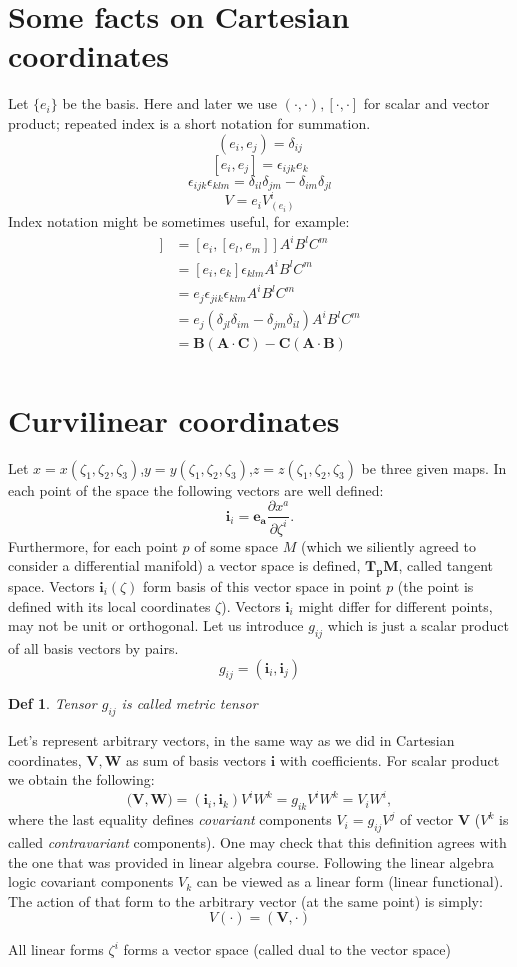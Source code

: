 \documentclass{article}
\newtheorem{defn}{Def}
\begin{document}
 \section{Some facts on Cartesian coordinates} Let $\{e_i\}$ be the basis. Here and later we use $(\cdot, \cdot), [\cdot, \cdot]$ for scalar and vector product; repeated index is a short notation for summation.
 $$(e_i, e_j)=\delta_{ij}$$
 $$[e_i, e_j] = \epsilon_{ijk}e_k$$
 $$\epsilon_{ijk}\epsilon_{klm} = \delta_{il}\delta_{jm} - \delta_{im}\delta_{jl}$$
 $$V=e_i V^i_{(e_i)}$$
 Index notation might be sometimes useful, for example:
 \begin{align*}
 [\mathbf{A}, [\mathbf{B},\mathbf{C}]] &= [e_i, [e_l, e_m]] A^i B^l C^m\\
 &= [e_i, e_k] \epsilon_{klm} A^i B^l C^m \\
 &= e_j \epsilon_{jik}\epsilon_{klm} A^i B^l C^m \\
 &= e_j (\delta_{jl}\delta_{im} - \delta_{jm}\delta_{il}) A^i B^l C^m \\
 &= \mathbf{B} (\mathbf{A}\cdot \mathbf{C}) - \mathbf{C} (\mathbf{A}\cdot \mathbf{B})\\
 \end{align*}
 \section{Curvilinear coordinates}
Let  $x = x(\zeta_1, \zeta_2, \zeta_3)$,$y = y(\zeta_1, \zeta_2, \zeta_3)$,$z = z(\zeta_1, \zeta_2, \zeta_3)$ be three given maps.
In each point of the space the following vectors are well defined:
 $$\mathbf{i}_i = \mathbf{e_a} \frac{\partial x^a}{\partial \zeta^i}.$$
 Furthermore, for each point $p$ of some space $M$ (which we siliently agreed to consider a differential manifold) a vector space is defined,  $\mathbf{T_p M}$, called tangent space. Vectors $\mathbf{i}_i (\zeta)$ form basis of this vector space in point  $p$ (the point is defined with its local coordinates $\zeta$). Vectors $\mathbf{i}_i$ might differ for different points, may not be unit or orthogonal. Let us introduce $g_{ij}$ which is just a scalar product of all basis vectors by pairs.
 $$g_{ij} = (\mathbf{i}_i, \mathbf{i}_j)$$
 \begin{defn}
 	Tensor  $g_{ij}$ is called metric tensor
 \end{defn}
 
 Let's represent arbitrary vectors, in the same way as we did in Cartesian coordinates,  $\mathbf{V,W}$ as sum of basis vectors $\mathbf{i}$ with coefficients.  For scalar product we obtain the following:
 $$(\mathbf{V,W)} = (\mathbf{i}_i, \mathbf{i}_k) V^i W^k = g_{ik} V^i W^k = V_i W^i,$$
 where the last equality defines \textit{covariant} components $V_i = g_{ij} V^j$ of vector $\mathbf{V}$ ($V^k$ is called \textit{contravariant} components). One may check that this definition agrees with the one that was provided in linear algebra course. Following the linear algebra logic covariant components $V_k$ can be viewed as a linear form (linear functional). The action of that form to the arbitrary vector (at the same point) is simply:
 $${V}(\cdot) = (\mathbf{V}, \cdot)$$
 
 All linear forms $\zeta^i$ forms a vector space (called dual to the vector space)   
 

 
 
\end{document}
